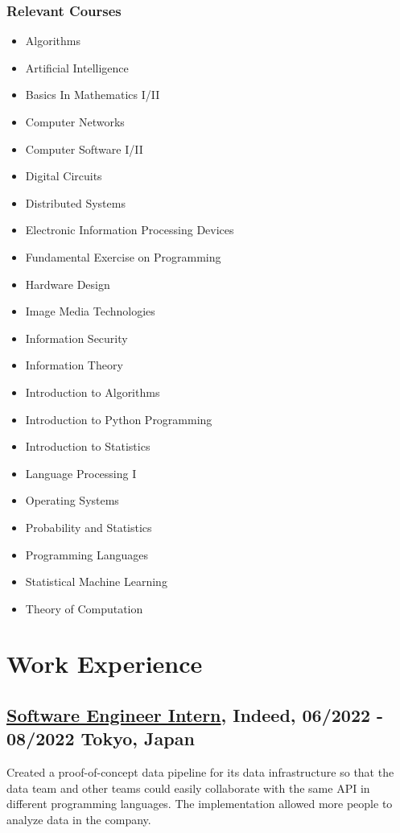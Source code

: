 \documentclass[10pt]{article}
\begin{document}
    \subsubsection*{Relevant Courses}
    \begin{multicols}{2}
      \begin{itemize}[noitemsep]
        \item Algorithms
        \item Artificial Intelligence
        \item Basics In Mathematics I/II
        \item Computer Networks
        \item Computer Software I/II
        \item Digital Circuits
        \item Distributed Systems
        \item Electronic Information Processing Devices
        \item Fundamental Exercise on Programming
        \item Hardware Design
        \item Image Media Technologies
        \item Information Security
        \item Information Theory
        \item Introduction to Algorithms
        \item Introduction to Python Programming
        \item Introduction to Statistics
        \item Language Processing I
        \item Operating Systems
        \item Probability and Statistics
        \item Programming Languages
        \item Statistical Machine Learning
        \item Theory of Computation
      \end{itemize}
    \end{multicols}

\section*{Work Experience}
  \subsection*{\underline{Software Engineer Intern}, Indeed, 06/2022 - 08/2022 \hfill Tokyo, Japan}
    Created a proof-of-concept data pipeline for its data infrastructure so that the data team and other teams could easily collaborate with the same API in different programming languages.
    The implementation allowed more people to analyze data in the company.
\end{document}
